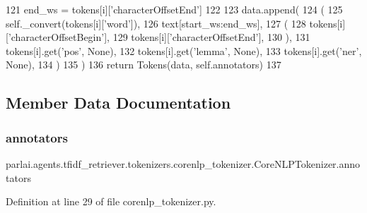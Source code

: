 \begin{DoxyCode}
121                 end\_ws = tokens[i][\textcolor{stringliteral}{'characterOffsetEnd'}]
122 
123             data.append(
124                 (
125                     self.\_convert(tokens[i][\textcolor{stringliteral}{'word'}]),
126                     text[start\_ws:end\_ws],
127                     (
128                         tokens[i][\textcolor{stringliteral}{'characterOffsetBegin'}],
129                         tokens[i][\textcolor{stringliteral}{'characterOffsetEnd'}],
130                     ),
131                     tokens[i].get(\textcolor{stringliteral}{'pos'}, \textcolor{keywordtype}{None}),
132                     tokens[i].get(\textcolor{stringliteral}{'lemma'}, \textcolor{keywordtype}{None}),
133                     tokens[i].get(\textcolor{stringliteral}{'ner'}, \textcolor{keywordtype}{None}),
134                 )
135             )
136         \textcolor{keywordflow}{return} Tokens(data, self.annotators)
137 \end{DoxyCode}


\subsection{Member Data Documentation}
\mbox{\label{classparlai_1_1agents_1_1tfidf__retriever_1_1tokenizers_1_1corenlp__tokenizer_1_1CoreNLPTokenizer_a3813fe96a6ae9af6f6490a6d3f4d6ea8}} 
\subsubsection{\texorpdfstring{annotators}{annotators}}
{\footnotesize\ttfamily parlai.\+agents.\+tfidf\+\_\+retriever.\+tokenizers.\+corenlp\+\_\+tokenizer.\+Core\+N\+L\+P\+Tokenizer.\+annotators}



Definition at line 29 of file corenlp\+\_\+tokenizer.\+py.

